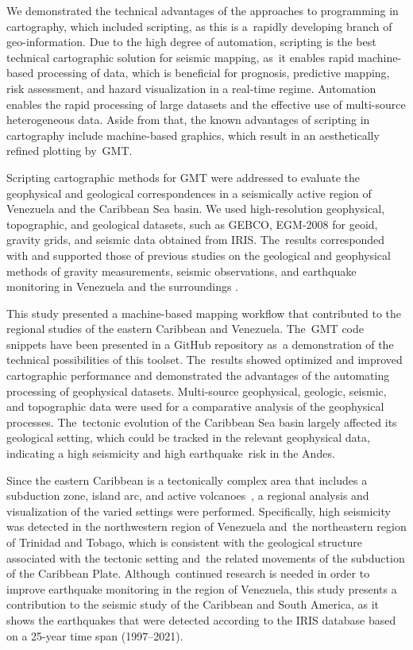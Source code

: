 \documentclass[sustainability,article,accept,pdftex,moreauthors]{Definitions/mdpi}
\begin{document}
We demonstrated the technical advantages of {the }approaches to programming  in cartography, which included{ }scripting, as this is a~rapidly developing branch of geo-information. %
 Due to the high degree of automation, scripting is the best technical cartographic solution for seismic mapping, as~it enables rapid machine-based processing of data, which is {beneficial }for prognosis, predictive mapping, risk assessment, and hazard visualization in a real-time regime. Automation enables the rapid processing of  large datasets  and the effective use of  multi-source heterogeneous data. Aside from{ }that, the known advantages of scripting in cartography include machine-based graphics, which result in an aesthetically refined plotting by~GMT. 

Scripting cartographic methods for GMT were addressed to evaluate the geophysical and geological correspondences in a seismically active region of Venezuela and the Caribbean Sea basin. We used {}high-resolution geophysical, topographic, and geological datasets, such as GEBCO, EGM-2008 for geoid, gravity grids, and seismic data obtained from IRIS. The~results  corresponded with and supported those of previous studies on the geological and geophysical methods of gravity measurements, seismic observations, and earthquake monitoring in Venezuela and the surroundings \citep{Guenther,Schmitz2008}.  

This study presented a machine-based mapping workflow that contributed to the regional studies of the eastern Caribbean and Venezuela. The~GMT code snippets have been presented in a GitHub repository as~a demonstration of the technical possibilities of this toolset. The~results showed {}optimized {and improved }cartographic performance and demonstrated the advantages of the automating processing of geophysical datasets. Multi-source geophysical, geologic, seismic, and topographic data were used for a comparative analysis of the geophysical processes. The~tectonic evolution of the Caribbean Sea basin largely affected its geological setting, which could be tracked in the relevant geophysical data, indicating a high seismicity and  high earthquake~risk  in the Andes.

Since the eastern Caribbean is a tectonically complex area that includes a subduction zone, island arc, and active volcanoes~\cite{Ambeh}, a regional analysis and visualization of the varied settings were performed. Specifically, high seismicity was detected in the northwestern region of Venezuela and~the northeastern region of Trinidad and Tobago, which is consistent with the geological structure associated with the tectonic setting and~the related movements of the subduction of the Caribbean Plate. Although~continued research is needed in order to improve earthquake monitoring in the region of Venezuela, this study presents a contribution to the seismic study of the Caribbean and South America, as it shows the earthquakes that were detected according to the IRIS database based on a 25-year time span (1997--2021). 
\end{document}
